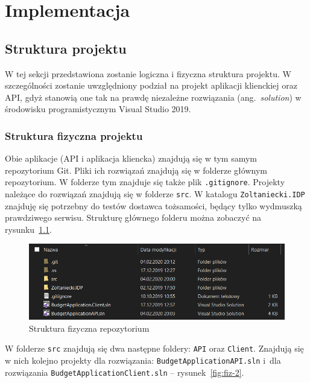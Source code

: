 \chapter{Implementacja}
\label{chap:implementacja}

\section{Struktura projektu}
\label{sec:struktura-projektu}

W tej sekcji przedstawiona zostanie logiczna i fizyczna struktura projektu. W szczególności zostanie uwzględniony podział na projekt aplikacji klienckiej oraz API, gdyż stanowią one tak na prawdę niezależne rozwiązania (ang.~\emph{solution}) w środowisku programistycznym Visual Studio 2019.

\subsection{Struktura fizyczna projektu}
\label{sec:struktura-fizyczna-projektu}

Obie aplikacje (API i aplikacja kliencka) znajdują się w tym samym repozytorium Git. Pliki ich rozwiązań znajdują się w folderze głównym repozytorium. W folderze tym znajduje się także plik \texttt{.gitignore}. Projekty należące do rozwiązań znajdują się w folderze \texttt{src}. W katalogu \texttt{Zoltaniecki.IDP} znajduję się potrzebny do testów dostawca tożsamości, będący tylko wydmuszką prawdziwego serwisu. Strukturę głównego folderu można zobaczyć na rysunku~\ref{fig:fiz-1}.

\begin{figure}[b]
	\centering
	\includegraphics[width=.8\linewidth]{rys04/struktura-fizyczna-1.PNG}
	\caption{Struktura fizyczna repozytorium}
	\label{fig:fiz-1}
\end{figure}

W folderze \texttt{src} znajdują się dwa następne foldery: \texttt{API} oraz \texttt{Client}. Znajdują się w nich kolejno projekty dla rozwiązania: \texttt{BudgetApplicationAPI.sln} i~dla rozwiązania \texttt{BudgetApplicationClient.sln} -- rysunek~\ref{fig:fiz-2}. 

